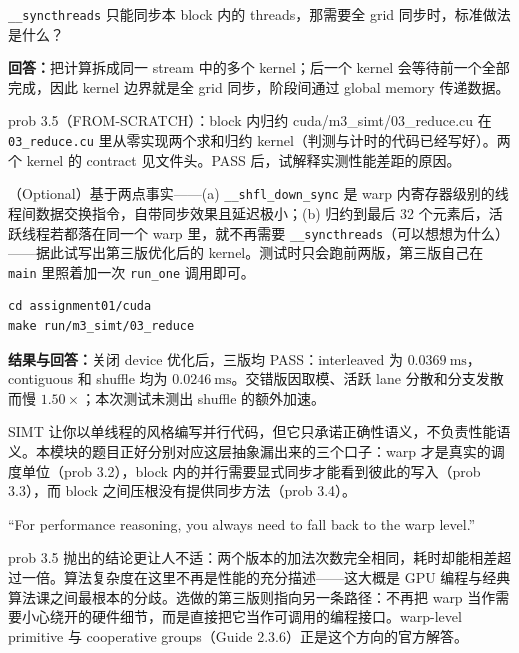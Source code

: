 \documentclass[11pt,a4paper,fontset=windows]{ctexart}
\begin{document}
\texttt{\_\_syncthreads} 只能同步本 block 内的 threads，那需要全 grid 同步时，标准做法是什么？

\par\textbf{回答：}把计算拆成同一 stream 中的多个 kernel；后一个 kernel 会等待前一个全部完成，因此 kernel 边界就是全 grid 同步，阶段间通过 global memory 传递数据。

\begin{capstone}{prob 3.5（FROM-SCRATCH）：block 内归约 \hfill {\footnotesize\ttfamily cuda/m3\_simt/03\_reduce.cu}}
在 \texttt{03\_reduce.cu} 里从零实现两个求和归约 kernel（判测与计时的代码已经写好）。两个 kernel 的 contract 见文件头。PASS 后，试解释实测性能差距的原因。

（Optional）基于两点事实——(a) \texttt{\_\_shfl\_down\_sync} 是 warp 内寄存器级别的线程间数据交换指令，自带同步效果且延迟极小；(b) 归约到最后 32 个元素后，活跃线程若都落在同一个 warp 里，就不再需要 \texttt{\_\_syncthreads}（可以想想为什么）——据此试写出第三版优化后的 kernel。测试时只会跑前两版，第三版自己在 \texttt{main} 里照着加一次 \texttt{run\_one} 调用即可。
\end{capstone}

\begin{lstlisting}
cd assignment01/cuda
make run/m3_simt/03_reduce
\end{lstlisting}

\par\textbf{结果与回答：}关闭 device 优化后，三版均 PASS：interleaved 为 $0.0369\ \mathrm{ms}$，contiguous 和 shuffle 均为 $0.0246\ \mathrm{ms}$。交错版因取模、活跃 lane 分散和分支发散而慢 $1.50\times$；本次测试未测出 shuffle 的额外加速。

\begin{lookback}
SIMT 让你以单线程的风格编写并行代码，但它只承诺正确性语义，不负责性能语义。本模块的题目正好分别对应这层抽象漏出来的三个口子：warp 才是真实的调度单位（prob 3.2），block 内的并行需要显式同步才能看到彼此的写入（prob 3.3），而 block 之间压根没有提供同步方法（prob 3.4）。

``For performance reasoning, you always need to fall back to the warp level.''

prob 3.5 抛出的结论更让人不适：两个版本的加法次数完全相同，耗时却能相差超过一倍。算法复杂度在这里不再是性能的充分描述——这大概是 GPU 编程与经典算法课之间最根本的分歧。选做的第三版则指向另一条路径：不再把 warp 当作需要小心绕开的硬件细节，而是直接把它当作可调用的编程接口。warp-level primitive 与 cooperative groups（Guide 2.3.6）正是这个方向的官方解答。
\end{lookback}
\end{document}
